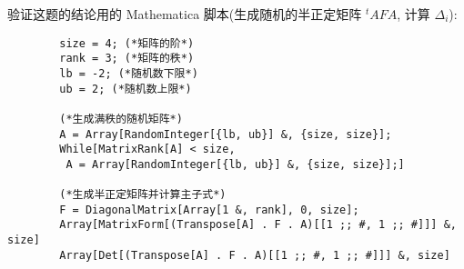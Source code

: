 \documentclass[color=black,device=normal,lang=cn,mode=geye]{elegantnote}
\begin{document}
\begin{solution}

    

\end{solution}
\begin{note}
    验证这题的结论用的 Mathematica 脚本(生成随机的半正定矩阵 ${}^tAFA$, 计算 $\Delta_i$):
    \begin{verbatim}
        size = 4; (*矩阵的阶*)
        rank = 3; (*矩阵的秩*)
        lb = -2; (*随机数下限*)
        ub = 2; (*随机数上限*)

        (*生成满秩的随机矩阵*)
        A = Array[RandomInteger[{lb, ub}] &, {size, size}];
        While[MatrixRank[A] < size, 
         A = Array[RandomInteger[{lb, ub}] &, {size, size}];]
        
        (*生成半正定矩阵并计算主子式*)
        F = DiagonalMatrix[Array[1 &, rank], 0, size];
        Array[MatrixForm[(Transpose[A] . F . A)[[1 ;; #, 1 ;; #]]] &, size]
        Array[Det[(Transpose[A] . F . A)[[1 ;; #, 1 ;; #]]] &, size]
    \end{verbatim}
\end{note}
\end{document}
